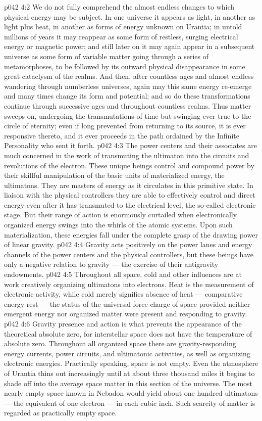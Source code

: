 \vs p042 4:2 We do not fully comprehend the almost endless changes to which physical energy may be subject. In one universe it appears as light, in another as light plus heat, in another as forms of energy unknown on Urantia; in untold millions of years it may reappear as some form of restless, surging electrical energy or magnetic power; and still later on it may again appear in a subsequent universe as some form of variable matter going through a series of metamorphoses, to be followed by its outward physical disappearance in some great cataclysm of the realms. And then, after countless ages and almost endless wandering through numberless universes, again may this same energy re\hyp{}emerge and many times change its form and potential; and so do these transformations continue through successive ages and throughout countless realms. Thus matter sweeps on, undergoing the transmutations of time but swinging ever true to the circle of eternity; even if long prevented from returning to its source, it is ever responsive thereto, and it ever proceeds in the path ordained by the Infinite Personality who sent it forth.
\vs p042 4:3 The power centers and their associates are much concerned in the work of transmuting the ultimaton into the circuits and revolutions of the electron. These unique beings control and compound power by their skillful manipulation of the basic units of materialized energy, the ultimatons. They are masters of energy as it circulates in this primitive state. In liaison with the physical controllers they are able to effectively control and direct energy even after it has transmuted to the electrical level, the so\hyp{}called electronic stage. But their range of action is enormously curtailed when electronically organized energy swings into the whirls of the atomic systems. Upon such materialization, these energies fall under the complete grasp of the drawing power of linear gravity.
\vs p042 4:4 Gravity acts positively on the power lanes and energy channels of the power centers and the physical controllers, but these beings have only a negative relation to gravity --- the exercise of their antigravity endowments.
\vs p042 4:5 Throughout all space, cold and other influences are at work creatively organizing ultimatons into electrons. Heat is the measurement of electronic activity, while cold merely signifies absence of heat --- comparative energy rest --- the status of the universal force\hyp{}charge of space provided neither emergent energy nor organized matter were present and responding to gravity.
\vs p042 4:6 Gravity presence and action is what prevents the appearance of the theoretical absolute zero, for interstellar space does not have the temperature of absolute zero. Throughout all organized space there are gravity\hyp{}responding energy currents, power circuits, and ultimatonic activities, as well as organizing electronic energies. Practically speaking, space is not empty. Even the atmosphere of Urantia thins out increasingly until at about three thousand miles it begins to shade off into the average space matter in this section of the universe. The most nearly empty space known in Nebadon would yield about one hundred ultimatons --- the equivalent of one electron --- in each cubic inch. Such scarcity of matter is regarded as practically empty space.

